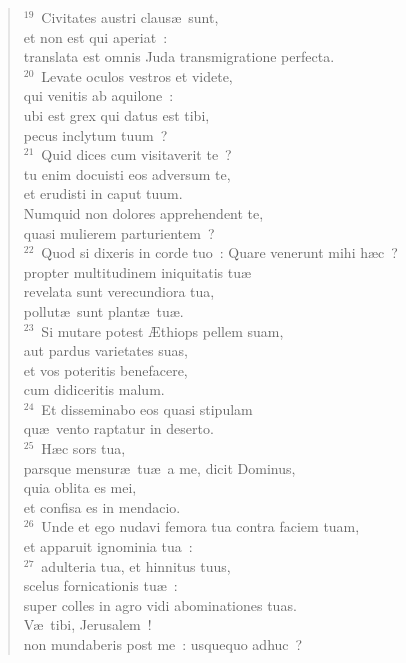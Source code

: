 \begin{flushleft}
\begin{verse}
${}^{19}$~Civitates austri claus\ae\ sunt,\\ et non est qui aperiat~:\\ translata est omnis Juda transmigratione perfecta.\\
${}^{20}$~Levate oculos vestros et videte,\\ qui venitis ab aquilone~:\\ ubi est grex qui datus est tibi,\\ pecus inclytum tuum~?\\
${}^{21}$~Quid dices cum visitaverit te~?\\ tu enim docuisti eos adversum te,\\ et erudisti in caput tuum.\\ Numquid non dolores apprehendent te,\\ quasi mulierem parturientem~?\\
${}^{22}$~Quod si dixeris in corde tuo~: Quare venerunt mihi h\ae c~?\\ propter multitudinem iniquitatis tu\ae \\ revelata sunt verecundiora tua,\\ pollut\ae\ sunt plant\ae\ tu\ae .\\
${}^{23}$~Si mutare potest \AE thiops pellem suam,\\ aut pardus varietates suas,\\ et vos poteritis benefacere,\\ cum didiceritis malum.\\
${}^{24}$~Et disseminabo eos quasi stipulam\\ qu\ae\ vento raptatur in deserto.\\
${}^{25}$~H\ae c sors tua,\\ parsque mensur\ae\ tu\ae\ a me, dicit Dominus,\\ quia oblita es mei,\\ et confisa es in mendacio.\\
${}^{26}$~Unde et ego nudavi femora tua contra faciem tuam,\\ et apparuit ignominia tua~:\\
${}^{27}$~adulteria tua, et hinnitus tuus,\\ scelus fornicationis tu\ae~:\\ super colles in agro vidi abominationes tuas.\\ V\ae\ tibi, Jerusalem~!\\ non mundaberis post me~: usquequo adhuc~?\end{verse}\end{flushleft}



